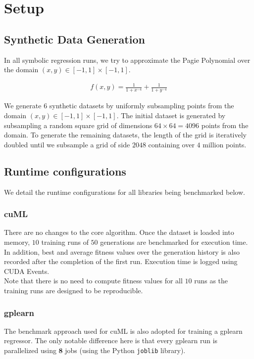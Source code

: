 \section{Setup}
\label{sec:setup}
\subsection{Synthetic Data Generation}
\label{subsec:datagen}
In all symbolic regression runs, we try to approximate the Pagie Polynomial\citep{Pagie1997} over the domain $(x,y) \in [-1,1] \times [-1,1]$.

\begin{align}
  f(x,y) = \frac{1}{1 + x^{-4}} + \frac{1}{1 + y^{-4}}
\end{align}

We generate $6$ synthetic datasets by uniformly subsampling points from the domain $(x,y) \in [-1,1] \times [-1,1]$. The initial dataset is generated by subsampling a random square grid of dimensions $64 \times 64 = 4096$ points from the domain. To generate the remaining datasets, the length of the grid is iteratively doubled until we subsample a grid of side $2048$ containing over $4$ million points.

\subsection{Runtime configurations}
\label{subsec:rtconfig}
We detail the runtime configurations for all libraries being benchmarked below. 
\subsubsection{cuML} 
There are no changes to the core algorithm. Once the dataset is loaded into memory, $10$ training runs of $50$ generations are benchmarked for execution time. In addition, best and average fitness values over the generation history is also recorded after the completion of the first run. Execution time is logged using CUDA Events.\\
Note that there is no need to compute fitness values for all $10$ runs as the training runs are designed to be reproducible. 

\subsubsection{gplearn}
The benchmark approach used for cuML is also adopted for training a gplearn regressor. The only notable difference here is that every gplearn run is parallelized using $\mathbf{8}$ jobs (using the Python \lstinline!joblib! library).

